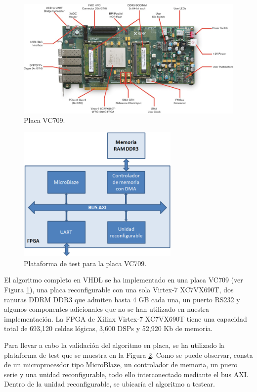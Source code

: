 \begin{figure}
  \centering
    \includegraphics[width=1\textwidth]{images/VC709.png}
  \caption{Placa VC709.}
  \label{fig:VC709}
\end{figure}

\begin{figure}
  \centering
    \includegraphics[width=0.7\textwidth]{images/plataforma_test.png}
  \caption{Plataforma de test para la placa VC709.}
  \label{fig:plataforma de test}
\end{figure}

El algoritmo completo en VHDL se ha implementado en una placa VC709 (ver Figura \ref{fig:VC709}), una placa reconfigurable con una sola Virtex-7 XC7VX690T, dos ranuras DDRM DDR3 que admiten hasta 4 GB cada una, un puerto RS232 y algunos componentes adicionales que no se han utilizado en nuestra implementación. La FPGA de Xilinx Virtex-7 XC7VX690T tiene una capacidad total de 693,120 celdas lógicas, 3,600 DSPs y 52,920 Kb de memoria.


Para llevar a cabo la validación del algoritmo en placa, se ha utilizado la plataforma de test que se muestra en la Figura \ref{fig:plataforma de test}. Como se puede observar, consta de un microprocesdor tipo MicroBlaze, un controlador de memoria, un puero serie y una unidad reconfigurable, todo ello interconectado mediante el bus AXI. Dentro de la unidad reconfigurable, se ubicaría el algoritmo a testear.

